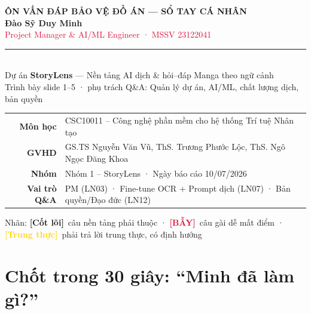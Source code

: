 \documentclass[11pt]{article}
\newcommand{\tagCore}{\textcolor{steel}{\footnotesize\textbf{[Cốt lõi]}}}
\newcommand{\tagTrap}{\textcolor{crimson}{\footnotesize\textbf{[BẪY]}}}
\newcommand{\tagHonest}{\textcolor{gold}{\footnotesize\textbf{[Trung thực]}}}
\begin{document}
\begin{titlepage}
\centering
\vspace*{2.0cm}
{\headfont\bfseries\fontsize{15}{18}\selectfont\textcolor{soft}{ÔN VẤN ĐÁP BẢO VỆ ĐỒ ÁN — SỔ TAY CÁ NHÂN}}\\[6pt]
{\headfont\bfseries\fontsize{40}{44}\selectfont\textcolor{ink}{Đào Sỹ Duy Minh}}\\[6pt]
{\large\headfont\textcolor{crimson}{Project Manager \& AI/ML Engineer · MSSV 23122041}}\\[10pt]
{\color{crimson}\rule{9cm}{2pt}}\\[10pt]
{\large Dự án \textbf{StoryLens} — Nền tảng AI dịch \& hỏi--đáp Manga theo ngữ cảnh}\\[4pt]
{\color{soft}\large Trình bày slide 1--5 · phụ trách Q\&A: Quản lý dự án, AI/ML, chất lượng dịch, bản quyền}\\[2.2cm]
\begin{tabular}{rl}
\textbf{Môn học} & CSC10011 -- Công nghệ phần mềm cho hệ thống Trí tuệ Nhân tạo\\[3pt]
\textbf{GVHD} & GS.TS Nguyễn Văn Vũ, ThS. Trương Phước Lộc, ThS. Ngô Ngọc Đăng Khoa\\[3pt]
\textbf{Nhóm} & Nhóm 1 -- StoryLens · Ngày báo cáo 10/07/2026\\[3pt]
\textbf{Vai trò Q\&A} & PM (LN03) · Fine-tune OCR + Prompt dịch (LN07) · Bản quyền/Đạo đức (LN12)\\
\end{tabular}
\vfill
{\color{soft}\small Nhãn: \tagCore\ câu nền tảng phải thuộc · \tagTrap\ câu gài dễ mất điểm · \tagHonest\ phải trả lời trung thực, có định hướng}
\end{titlepage}

\tableofcontents
\newpage

\section{Chốt trong 30 giây: ``Minh đã làm gì?''}
\end{document}
